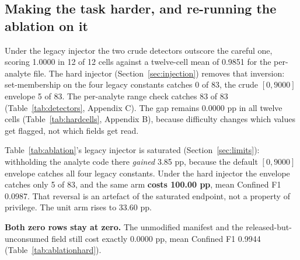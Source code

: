 \subsection{Making the task harder, and re-running the ablation on it}
\label{sec:hard}
\label{sec:ablationhard}

Under the legacy injector the two crude detectors outscore the careful one, scoring 1.0000 in 12 of
12 cells against a twelve-cell mean of 0.9851 for the per-analyte file. The hard injector
(Section~\ref{sec:injection}) removes that inversion: set-membership on the four legacy constants
catches 0 of 83, the crude $[0, 9000]$ envelope 5 of 83. The per-analyte range check catches 83
of 83 (Table~\ref{tab:detectors}, Appendix C). The gap remains $0.0000$ pp in all twelve cells
(Table~\ref{tab:hardcells}, Appendix B), because difficulty changes which values get flagged, not
which fields get read.

Table~\ref{tab:ablation}'s legacy injector is saturated (Section~\ref{sec:limits}): withholding the
analyte code there \emph{gained} 3.85 pp, because the default $[0, 9000]$ envelope catches all four
legacy constants. Under the hard injector the envelope catches only 5 of 83, and the same arm
\textbf{costs 100.00 pp}, mean Confined F1 0.0987. That reversal is an artefact of the saturated
endpoint, not a property of privilege. The unit arm rises to 33.60 pp.

\textbf{Both zero rows stay at zero.} The unmodified manifest and the released-but-unconsumed field
still cost exactly 0.0000 pp, mean Confined F1 0.9944 (Table~\ref{tab:ablationhard}).

